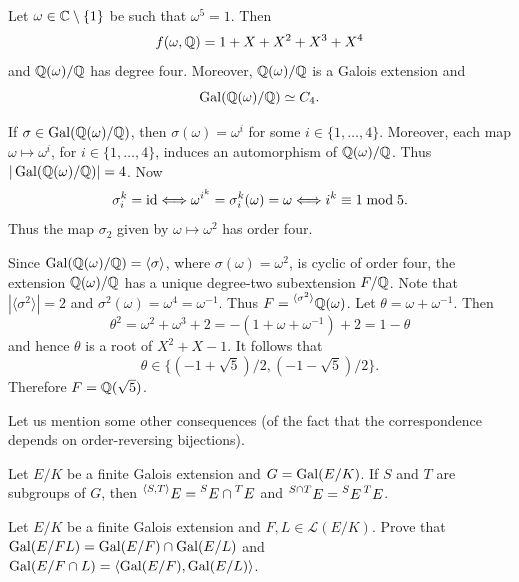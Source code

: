 \begin{example}
    Let $\omega\in\mathbb{C}\setminus\{1\}$ be such that $\omega^5=1$.
    Then 
    \[
    f(\omega,\mathbb{Q})=1+X+X^2+X^3+X^4
    \]
    and $\mathbb{Q}(\omega)/\mathbb{Q}$ has
    degree four. 
    Moreover, $\mathbb{Q}(\omega)/\mathbb{Q}$ is a Galois extension
    and 
    \[
    \operatorname{Gal}(\mathbb{Q}(\omega)/\mathbb{Q})\simeq C_4.
    \]
    
    If $\sigma\in \operatorname{Gal}(\mathbb{Q}(\omega)/\mathbb{Q})$,
    then $\sigma(\omega)=\omega^i$ for some $i\in\{1,\dots,4\}$. 
    Moreover, each  
    map $\omega\mapsto\omega^i$, for $i\in\{1,\dots,4\}$, induces an automorphism
    of $\mathbb{Q}(\omega)/\mathbb{Q}$. Thus $|\operatorname{Gal}(\mathbb{Q}(\omega)/\mathbb{Q})|=4$. Now 
    \[
    \sigma_i^k=\operatorname{id}\Longleftrightarrow
    \omega^{i^k}=\sigma_i^k(\omega)=\omega\Longleftrightarrow
    i^k\equiv1\bmod 5.
    \]
    Thus the map $\sigma_2$ given 
    by $\omega\mapsto\omega^2$ has order four. 
    
    Since $\operatorname{Gal}(\mathbb{Q}(\omega)/\mathbb{Q})=\langle\sigma\rangle$,
    where $\sigma(\omega)=\omega^2$, 
    is cyclic of order four, 
    the extension $\mathbb{Q}(\omega)/\mathbb{Q}$ has a unique degree-two 
    subextension $F/\mathbb{Q}$. Note that $|\langle\sigma^2\rangle|=2$ 
    and $\sigma^2(\omega)=\omega^4=\omega^{-1}$. Thus 
    $F=\prescript{\langle\sigma^2\rangle}{}{\mathbb{Q}(\omega)}$. Let 
    $\theta=\omega+\omega^{-1}$. Then 
    \[
    \theta^2=\omega^2+\omega^3+2=-(1+\omega+\omega^{-1})+2=1-\theta
    \]
    and hence $\theta$ is a root of $X^2+X-1$. It follows that 
    \[
    \theta\in\{(-1+\sqrt{5})/2,(-1-\sqrt{5})/2\}.
    \]
    Therefore
    $F=\mathbb{Q}(\sqrt{5})$. 
\end{example}

Let us mention some other consequences (of the fact that the correspondence 
depends on order-reversing bijections). 

\begin{exercise}
    Let $E/K$ be a finite Galois extension and $G=\operatorname{Gal}(E/K)$. 
    If $S$ and $T$ are subgroups of $G$, then 
    $\prescript{\langle S,T\rangle}{}{E}=\prescript{S}{}{E}\cap \prescript{T}{}{E}$ and 
    $\prescript{S\cap T}{}{E}=\prescript{S}{}{E}\prescript{T}{}{E}$.
\end{exercise}

\begin{exercise}
Let $E/K$ be a finite Galois extension 
and $F,L\in \mathcal{L}(E/K)$. Prove that $\operatorname{Gal}(E/FL)=\operatorname{Gal}(E/F)\cap\operatorname{Gal}(E/L)$ and 
$\operatorname{Gal}(E/F\cap L)=\langle\operatorname{Gal}(E/F),\operatorname{Gal}(E/L)\rangle$.    
\end{exercise}



